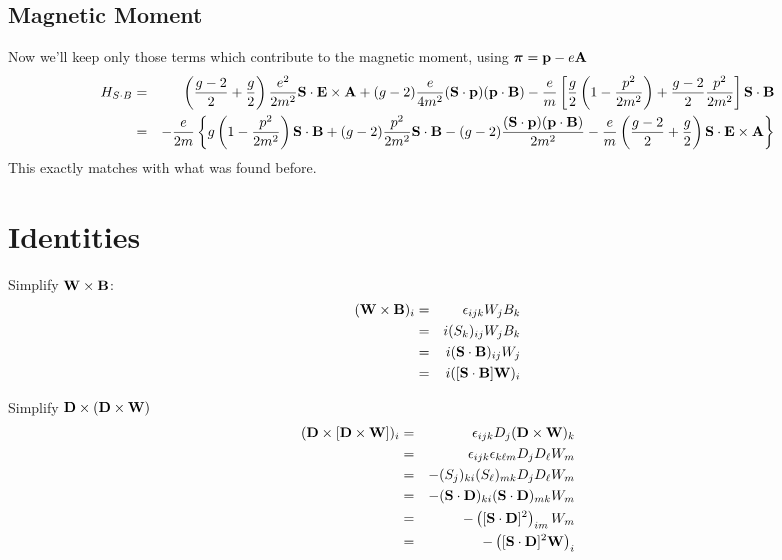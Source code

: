 \subsection*{Magnetic Moment}
Now we'll keep only those terms which contribute to the magnetic moment, using $\mbox{\boldmath$ \pi $} = \mathbf{p} - e\mathbf{A}$
\begin{eqnarray*}
H_{S\cdot B}	&=&
		 \left(\frac{g-2}{2} + 	\frac{g}{2}\right)\frac{e^2}{2m^2} \mathbf{S} \cdot \mathbf{E} \times \mathbf{A}
		+  (g-2)\frac{e}{4m^2} (\mathbf{S} \cdot \mathbf{p}) (\mathbf{p} \cdot \mathbf{B})
		-  \frac{e}{m}\left [\frac{g}{2}\left(1 - \frac{p^2}{2m^2}\right) + \frac{g-2}{2}\frac{p^2}{2m^2} \right] \mathbf{S} 		\cdot \mathbf{B}		\\
	&=&		-\frac{e}{2m} \left\{
			g \left(1 - \frac{p^2}{2m^2}\right)  \mathbf{S} \cdot \mathbf{B}	
			+(g-2) \frac{p^2}{2m^2} \mathbf{S} \cdot \mathbf{B}	
			-(g-2) \frac{ (\mathbf{S} \cdot \mathbf{p}) (\mathbf{p} \cdot \mathbf{B})}{2m^2}
			-\frac{e}{m} \left(\frac{g-2}{2} + 	\frac{g}{2}\right) \mathbf{S} \cdot \mathbf{E} \times \mathbf{A}
		\right\}
\end{eqnarray*}
This exactly matches with what was found before.



\section{Identities}

Simplify $ \mathbf{W} \times \mathbf{B}$:
\begin{eqnarray*}
(\mathbf{W} \times \mathbf{B})_i
	&=&	\epsilon_{ijk} W_j B_k	\\
	&=&	i(S_k)_{ij} W_j B_k\\
	&=&	i(\mathbf{S} \cdot \mathbf{B})_{ij} W_j	\\
	&=&	i([\mathbf{S} \cdot \mathbf{B}] \mathbf{W})_i
\end{eqnarray*}

Simplify $\mathbf{D} \times ( \mathbf{D} \times \mathbf{W} ) $
\begin{eqnarray*}
(\mathbf{D} \times [ \mathbf{D} \times \mathbf{W} ] )_i
	&=&	\epsilon_{ijk} D_j (\mathbf{D} \times \mathbf{W})_k	\\
	&=&	\epsilon_{ijk} \epsilon_{k\ell m} D_j D_\ell W_m	\\
	&=&	-(S_j)_{ki} (S_\ell)_{mk} D_j D_\ell W_m	\\
	&=&	-(\mathbf{S} \cdot \mathbf{D})_{ki} (\mathbf{S} \cdot \mathbf{D})_{mk} W_m	\\
	&=&	-\left( [\mathbf{S} \cdot \mathbf{D}]^2 \right)_{im} W_m	\\
	&=&	-\left( [\mathbf{S} \cdot \mathbf{D}]^2 \mathbf{W} \right)_i	\\
\end{eqnarray*}

